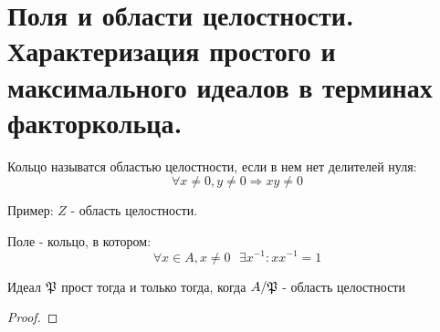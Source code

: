 \section{Поля и области целостности. Характеризация простого и максимального идеалов в терминах факторкольца.}

\begin{defn}
Кольцо называтся областью целостности, если в нем нет делителей нуля:
\[\forall x \neq 0, y \neq 0 \Rightarrow xy \neq 0\]
\end{defn}

Пример: $Z$ - область целостности.

\begin{defn}
Поле - кольцо, в котором:
\[\forall x \in A, x \neq 0~~~\exists x^{-1}: xx^{-1} = 1\]
\end{defn}

\begin{thm}
Идеал $\mathfrak{P}$ прост тогда и только тогда, когда $A/\mathfrak{P}$ - область целостности
\end{thm}
\begin{proof}

\end{proof}
